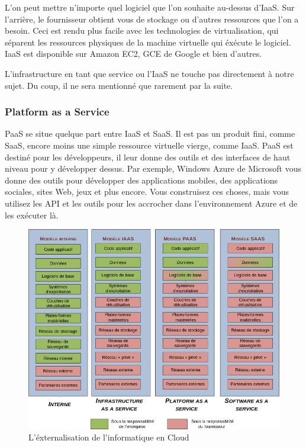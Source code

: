 \begin{onehalfspace}
L'on peut mettre n'importe quel logiciel que l'on souhaite au-dessus d'IaaS. Sur l'arrière, le fournisseur obtient vous de stockage ou d'autres ressources que l'on a besoin. Ceci est rendu plus facile avec les technologies de virtualisation, qui séparent les ressources physiques de la machine virtuelle qui éxécute le logiciel. IaaS est disponible sur Amazon EC2, GCE de Google et bien d'autres.

L'infrastructure en tant que service ou l'IaaS ne touche pas directement à notre sujet. Du coup, il ne sera mentionné que rarement par la suite.

\subsubsection*{Platform as a Service}

PaaS se situe quelque part entre IaaS et SaaS. Il est pas un produit fini, comme SaaS, encore moins une simple ressource virtuelle vierge, comme IaaS. PaaS est destiné pour les développeurs, il leur donne des outils et des interfaces de haut niveau pour y développer dessus. Par exemple, Windows Azure de Microsoft vous donne des outils pour développer des applications mobiles, des applications sociales, sites Web, jeux et plus encore. Vous construisez ces choses, mais vous utilisez les API et les outils pour les accrocher dans l'environnement Azure et de les exécuter là.


\begin{figure}[H]
\centering
\includegraphics [scale=0.5]{chapitre2/assets/cloud-vs.png}
\caption{L'éxternalisation de l'informatique en Cloud}
\end{figure}



\end{onehalfspace}
